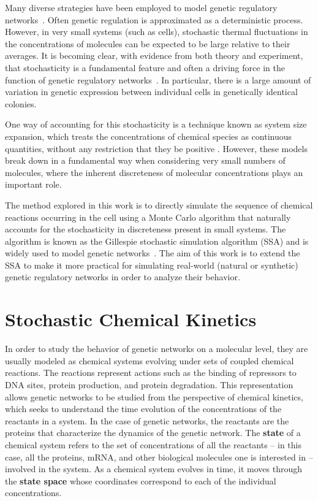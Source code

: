 \documentclass[english,letterpaper,12pt]{report}
\newcommand{\defkeywd}[1]{\textbf{#1}}
\begin{document}
\begin{doublespacing}
Many diverse strategies have been employed to model genetic regulatory networks~\cite{review-in-numero}\cite{bistable-modeling}\cite{gillespie-ssa}\cite{cme-closure}. Often genetic regulation is approximated as a deterministic process. However, in very small systems (such as cells), stochastic thermal fluctuations in the concentrations of molecules can be expected to be large relative to their averages. It is becoming clear, with evidence from both theory and experiment, that stochasticity is a fundamental feature and often a driving force in the function of genetic regulatory networks~\cite{ecoli-decision}\cite{stoch-theories}\cite{stoch-single-cell}\cite{delay-oscillations}. In particular, there is a large amount of variation in genetic expression between individual cells in genetically identical colonies.

One way of accounting for this stochasticity is a technique known as system size expansion, which treats the concentrations of chemical species as continuous quantities, without any restriction that they be positive \cite{langevin-limit}\cite{delayed-deg-notes}. However, these models break down in a fundamental way when considering very small numbers of molecules, where the inherent discreteness of molecular concentrations plays an important role.

The method explored in this work is to directly simulate the sequence of chemical reactions occurring in the cell using a Monte Carlo algorithm that naturally accounts for the stochasticity in discreteness present in small systems. The algorithm is known as the Gillespie stochastic simulation algorithm (SSA) and is widely used to model genetic networks~\cite{we-chemkin}\cite{stoch-sys-bio}. The aim of this work is to extend the SSA to make it more practical for simulating real-world (natural or synthetic) genetic regulatory networks in order to analyze their behavior.


\section{Stochastic Chemical Kinetics} %
\label{sec:chemkin}

In order to study the behavior of genetic networks on a molecular level, they are usually modeled as chemical systems evolving under sets of coupled chemical reactions. The reactions represent actions such as the binding of repressors to DNA sites, protein production, and protein degradation. This representation allows genetic networks to be studied from the perspective of chemical kinetics, which seeks to understand the time evolution of the concentrations of the reactants in a system. In the case of genetic networks, the reactants are the proteins that characterize the dynamics of the genetic network. The \defkeywd{state} of a chemical system refers to the set of concentrations of all the reactants -- in this case, all the proteins, mRNA, and other biological molecules one is interested in -- involved in the system. As a chemical system evolves in time, it moves through the \defkeywd{state space} whose coordinates correspond to each of the individual concentrations.


\end{doublespacing}
\end{document}

